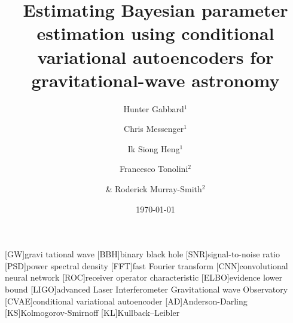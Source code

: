 \documentclass[%
showpacs,
 amsmath,amssymb,
 aps,
 twocolumn,
 prl,
 reprint,
floatfix,
]{revtex4-1}
\begin{document}

\title{Estimating Bayesian parameter estimation using conditional variational
autoencoders for gravitational-wave astronomy}

\author{Hunter Gabbard$^1$}
\author{Chris Messenger$^1$}
\author{Ik Siong Heng$^1$}
\author{Francesco Tonolini$^2$}
\author{\& Roderick Murray-Smith$^2$}


\date{\today}

\maketitle

[GW]{gravi	tational wave}
[BBH]{binary black hole}
[SNR]{signal-to-noise ratio}
[PSD]{power spectral density}
[FFT]{fast Fourier transform}
[CNN]{convolutional neural network}
[ROC]{receiver operator characteristic}
[ELBO]{evidence lower bound}
[LIGO]{advanced Laser Interferometer Gravitational wave Observatory}
[CVAE]{conditional variational autoencoder}
[AD]{Anderson-Darling}
[KS]{Kolmogorov-Smirnoff}
[KL]{Kullback–Leibler}
\end{document}
